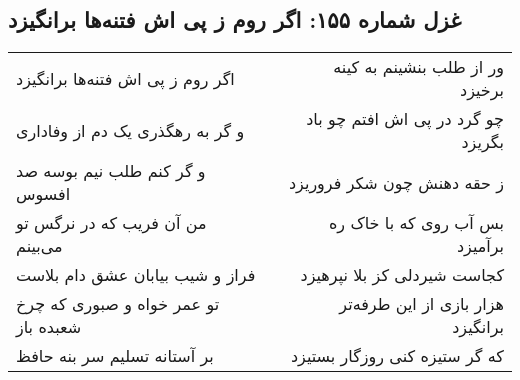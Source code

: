 \begin{center}
\section*{غزل شماره ۱۵۵: اگر روم ز پی اش فتنه‌ها برانگیزد}
\label{sec:sh155}
\begin{longtable}{l p{0.5cm} r}
اگر روم ز پی اش فتنه‌ها برانگیزد
&&
ور از طلب بنشینم به کینه برخیزد
\\
و گر به رهگذری یک دم از وفاداری
&&
چو گرد در پی اش افتم چو باد بگریزد
\\
و گر کنم طلب نیم بوسه صد افسوس
&&
ز حقه دهنش چون شکر فروریزد
\\
من آن فریب که در نرگس تو می‌بینم
&&
بس آب روی که با خاک ره برآمیزد
\\
فراز و شیب بیابان عشق دام بلاست
&&
کجاست شیردلی کز بلا نپرهیزد
\\
تو عمر خواه و صبوری که چرخ شعبده باز
&&
هزار بازی از این طرفه‌تر برانگیزد
\\
بر آستانه تسلیم سر بنه حافظ
&&
که گر ستیزه کنی روزگار بستیزد
\\
\end{longtable}
\end{center}
